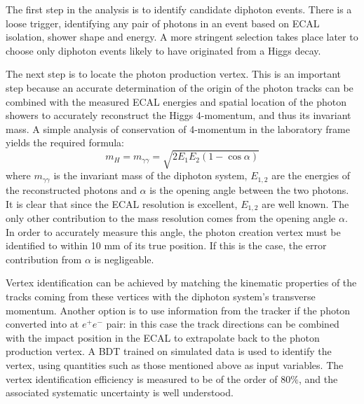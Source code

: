 \documentclass[10pt]{article}
\begin{document}
The first step in the analysis is to identify candidate diphoton events. There is a loose trigger, identifying any pair of photons in an event based on ECAL isolation, shower shape and energy. A more stringent selection takes place later to choose only diphoton events likely to have originated from a Higgs decay.
 
The next step is to locate the photon production vertex. This is an important step because an accurate determination of the origin of the photon tracks can be combined with the measured ECAL energies and spatial location of the photon showers to accurately reconstruct the Higgs 4-momentum, and thus its invariant mass. A simple analysis of conservation of 4-momentum in the laboratory frame yields the required formula:
\begin{equation} m_H=m_{\gamma\gamma}=\sqrt{2E_1 E_2 (1-\cos{\alpha})} \end{equation} where $m_{\gamma\gamma} $ is the invariant mass of the diphoton system, $E_{1,2}$ are the energies of the reconstructed photons and $\alpha$ is the opening angle between the two photons.
It is clear that since the ECAL resolution is excellent, $E_{1,2}$ are well known. The only other contribution to the mass resolution comes from the opening angle $\alpha$. In order to accurately measure this angle, the photon creation vertex must be identified to within 10 mm of its true position. If this is the case, the error contribution from $\alpha$ is negligeable.

Vertex identification can be achieved by matching the kinematic properties of the tracks coming from these vertices with the diphoton system's transverse momentum. Another option is to use information from the tracker if the photon converted into at $e^+ e^-$ pair: in this case the track directions can be combined with the impact position in the ECAL to extrapolate back to the photon production vertex. A BDT trained on simulated data is used to identify the vertex, using quantities such as those mentioned above as input variables. The vertex identification efficiency is measured to be of the order of 80$\%$, and the associated systematic uncertainty is well understood. 
\end{document}
